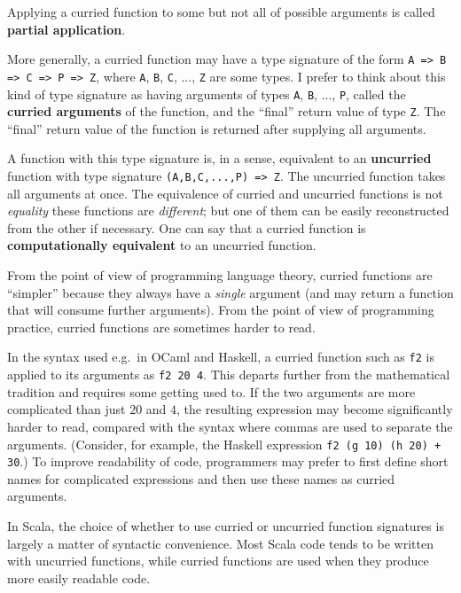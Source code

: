 Applying a curried function to some but not all of possible arguments
is called \textbf{partial application}.

More generally, a curried function may have a type signature of the
form \lstinline!A => B => C => P => Z!, where \lstinline!A!, \lstinline!B!,
\lstinline!C!, ..., \lstinline!Z! are some types. I prefer to think
about this kind of type signature as having arguments of types \lstinline!A!,
\lstinline!B!, ..., \lstinline!P!, called the \textbf{curried
arguments} of the function, and the ``final'' return value of type
\lstinline!Z!. The ``final'' return value of the function is returned
after supplying all arguments.

A function with this type signature is, in a sense, equivalent to
an \textbf{uncurried} function with type
signature \lstinline!(A,B,C,...,P) => Z!. The uncurried function
takes all arguments at once. The equivalence of curried and uncurried
functions is not \emph{equality}  \textendash{}  these functions are
\emph{different}; but one of them can be easily reconstructed from
the other if necessary. One can say that a curried function is \textbf{computationally
equivalent} to an uncurried function.

From the point of view of programming language theory, curried functions
are ``simpler'' because they always have a \emph{single} argument
(and may return a function that will consume further arguments). From
the point of view of programming practice, curried functions are sometimes
harder to read.

In the syntax used e.g.\ in OCaml and Haskell, a curried function
such as \lstinline!f2! is applied to its arguments as \lstinline!f2 20 4!.
This departs further from the mathematical tradition and requires
some getting used to. If the two arguments are more complicated than
just $20$ and $4$, the resulting expression may become significantly
harder to read, compared with the syntax where commas are used to
separate the arguments. (Consider, for example, the Haskell expression
\lstinline!f2 (g 10) (h 20) + 30!.) To improve readability of code,
programmers may prefer to first define short names for complicated
expressions and then use these names as curried arguments.

In Scala, the choice of whether to use curried or uncurried function
signatures is largely a matter of syntactic convenience. Most Scala
code tends to be written with uncurried functions, while curried functions
are used when they produce more easily readable code.

